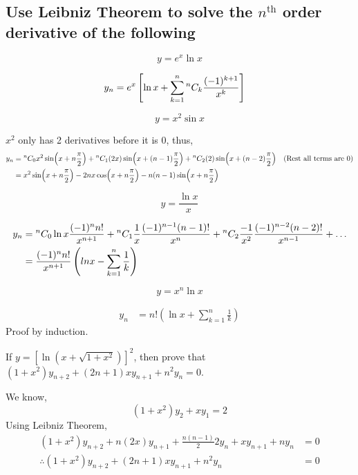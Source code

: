 \subsection{Use Leibniz Theorem to solve the $n^\text{th}$ order derivative of the following}
\begin{asign}
	\[y=e^x\ln x\]
\end{asign}
\begin{anse}
	\[\begin{split}
		y_n&=e^x\left[\ln x+\sum_{k=1}^{n}{}^{n}C_{k}\frac{(-1)^{k+1}}{x^k}\right]
	\end{split}\]
\end{anse}
\begin{asign}
	\[y=x^2\sin x\]
\end{asign}
\begin{anse}
	$x^2$ only has 2 derivatives before it is 0, thus,
	\[\begin{split}
		y_n&={}^{n}C_{0}x^2\sin(x+n\frac{\pi}{2})+{}^{n}C_{1}(2x)\sin(x+(n-1)\frac{\pi}{2})+{}^{n}C_{2}(2)\sin(x+(n-2)\frac{\pi}{2}) \quad (\text{Rest all terms are 0})\\
		&=x^2\sin(x+n\frac{\pi}{2})-2nx\cos(x+n\frac{\pi}{2})-n(n-1)\sin(x+n\frac{\pi}{2})
	\end{split}\]
\end{anse}
\begin{asign}
	\[y=\frac{\ln x}{x}\]
\end{asign}
\begin{anse}
	\[\begin{split}
		y_n&={}^{n}C_{0}\ln x \frac{(-1)^nn!}{x^{n+1}}+{}^{n}C_{1}\frac{1}{x}\frac{(-1)^{n-1}(n-1)!}{x^{n}} +{}^{n}C_{2}\frac{-1}{x^2}\frac{(-1)^{n-2}(n-2)!}{x^{n-1}}+\ldots\\
		&=\frac{(-1)^nn!}{x^{n+1}}\left(ln x-\sum_{k=1}^{n}\frac{1}{k}\right)
	\end{split}\]
\end{anse}
\begin{asign}
	\[y=x^n\ln x\]
\end{asign}
\begin{anse}
	\[\begin{split}
		y_n&=n!\left(\ln x+\sum_{k=1}^{n}\frac{1}{k} \right)
	\end{split}\]
	Proof by induction.
\end{anse}
\begin{asign}
	If $y=\left[\ln(x+\sqrt{1+x^2})\right]^2$, then prove that $(1+x^2)y_{n+2}+(2n+1)xy_{n+1}+n^2y_n=0$.
\end{asign}
\begin{anse}
	We know,
	\[(1+x^2)y_2+xy_1=2\]
	Using Leibniz Theorem,
	\[\begin{split}
		(1+x^2)y_{n+2}+n(2x)y_{n+1}+\frac{n(n-1)}{2}2y_n+xy_{n+1}+ny_n&=0\\
		\therefore (1+x^2)y_{n+2}+(2n+1)xy_{n+1}+n^2y_n&=0
	\end{split}\]
\end{anse}
